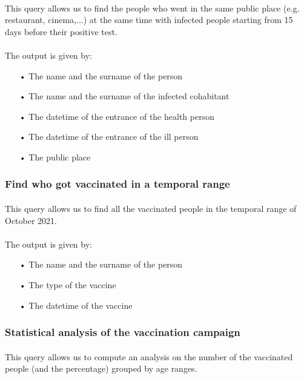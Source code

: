 \documentclass[a4paper,12pt]{article}
\begin{document}
\paragraph{} This query allows us to find the people who went in the same public place (e.g. restaurant, cinema,...) at the same time with infected people starting from 15 days before their positive test.
\paragraph{} The output is given by: 
\begin{itemize}
\item[•] The name and the surname of the person
\item[•] The name and the surname of the infected cohabitant
\item[•] The datetime of the entrance of the health person
\item[•] The datetime of the entrance of the ill person
\item[•] The public place
\end{itemize}

\subsubsection{Find who got vaccinated in a temporal range}
\paragraph{} This query allows us to find all the vaccinated people in the temporal range of October 2021.
\paragraph{} The output is given by: 
\begin{itemize}
\item[•] The name and the surname of the person
\item[•] The type of the vaccine
\item[•] The datetime of the vaccine

\end{itemize}
\pagebreak

\subsubsection{Statistical analysis of the vaccination campaign}
\paragraph{} This query allows us to compute an analysis on the number of the vaccinated people (and the percentage) grouped by age ranges.
\end{document}
